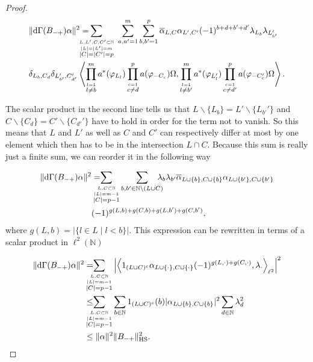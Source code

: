 \documentclass[b5paper,draft,openbib,12pt]{memoir}
\begin{document}
\begin{proof}
\begin{align}\nonumber
&\|\mathrm{d}\Gamma(B_{-+})\alpha\|^2= \hspace{-0.5cm}\sum_{\overset{L,L',C,C'\subset\mathbb{N}}{\overset{|L|=|L'|=m}{|C|=|C'|=p}}} ~\sum_{a,a'=1}^m \sum_{b,b'=1}^p
\overline{\alpha}_{L,C} \alpha_{L',C'}(-1)^{b+d+b'+d'}\lambda_{L_b} \lambda_{L_{b'}'} \\
&\delta_{L_b,C_d} \delta_{L_{b'}',C_{d'}'} \left\langle \prod_{\overset{l=1}{l\neq b}}^m a^*(\varphi_{L_l})\prod_{\overset{c=1}{c\neq d}}^p 
a(\varphi_{-C_c})\Omega, \prod_{\overset{l=1}{l\neq b'}}^m a^*(\varphi_{L_l'})
\prod_{\overset{c=1}{c\neq d'}}^p a(\varphi_{-C_c'})\Omega\right\rangle.
\end{align}

The scalar product in the second line tells us that \(L\backslash \{L_b\}=L'\backslash \{L_{b'}'\}\) and \(C\backslash \{C_{d}\}=C'\backslash \{C_{d'}'\}\) have
to hold in order for the term not to vanish. So this means that \(L\) and \(L'\) as well as \(C\) and \(C'\) can respectively differ at most by one element
which then has to be in the intersection \(L\cap C\). Because this sum is really just a finite sum, we can reorder it in the following way

\begin{align}\nonumber
\|\mathrm{d}\Gamma(B_{-+})\alpha\|^2
&=\hspace{-0.4cm}\sum_{\overset{L,C\subset\mathbb{N}}{\overset{|L|=m-1}{|C|=p-1}}} \sum_{b,b'\in \mathbb{N}\backslash (L\cup C)}\hspace{-0.3cm} \lambda_{b} \lambda_{b'} 
\overline{\alpha}_{L\cup\{b\},C\cup \{b\}} \alpha_{L\cup\{b'\},C\cup\{b'\}}\\
&(-1)^{g(L,b)+g(C,b)+g(L,b')+g(C,b')},
\end{align}
where \(g(L,b)=|\{l\in L \mid l<b\}|\). This expression can be rewritten in terms of a scalar product in \(\ell^2(\mathbb{N})\)

\begin{align}\nonumber
\|\mathrm{d}\Gamma(B_{-+})\alpha\|^2
&=\hspace{-0.4cm}\sum_{\overset{L,C\subset\mathbb{N}}{\overset{|L|=m-1}{|C|=p-1}}} \left|\left\langle 1_{(L\cup C)^c} \alpha_{L\cup \{\cdot \}, C\cup \{\cdot\}} (-1)^{g(L,\cdot)+g(C,\cdot)},\lambda_\cdot \right\rangle_{\ell^2}  \right|^2 \\
&\le \hspace{-0.4cm}\sum_{\overset{L,C\subset\mathbb{N}}{\overset{|L|=m-1}{|C|=p-1}}} \sum_{b\in \mathbb{N}} 1_{(L\cup C)^c}(b) |\alpha_{L\cup\{b\},C\cup\{b\}}|^2 \sum_{d\in\mathbb{N}}\lambda_d^2\\
&\le \|\alpha\|^2 \|B_{-+}\|^2_{\text{HS}}.
\end{align}

\end{proof}
\end{document}

